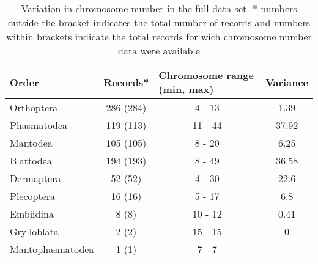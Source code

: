\begin{table}
\begin{tabular}{lccc}
\hline
Order            & \multicolumn{1}{l}{Records*} & \multicolumn{1}{l}{Chromosome range (min, max)} & \multicolumn{1}{l}{Variance} \\ \hline
Orthoptera       & 286 (284)                    & 4 - 13                                          & 1.39                         \\
Phasmatodea      & 119 (113)                    & 11 - 44                                         & 37.92                        \\
Mantodea         & 105 (105)                    & 8 - 20                                          & 6.25                         \\
Blattodea        & 194 (193)                    & 8 - 49                                          & 36.58                        \\
Dermaptera       & 52 (52)                      & 4 - 30                                          & 22.6                         \\
Plecoptera       & 16 (16)                      & 5 - 17                                          & 6.8                          \\
Embiidina        & 8 (8)                        & 10 - 12                                         & 0.41                         \\
Grylloblata      & 2 (2)                        & 15 - 15                                         & 0                            \\
Mantophasmatodea & 1 (1)                        & 7 - 7                                           & -                            \\ \hline
\end{tabular}
\caption{Variation in chromosome number in the full data set. * numbers outside the bracket indicates the total number of records and numbers within brackets indicate the total records for wich chromosome number data were available}
\label{tab:chrom.var}
\end{table}







